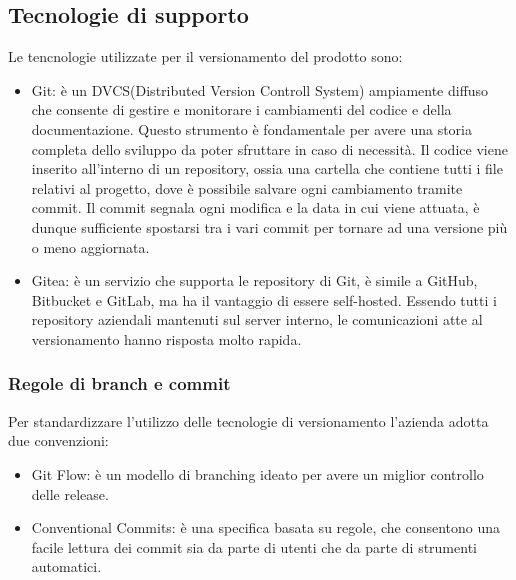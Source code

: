 \subsection{Tecnologie di supporto}
Le tencnologie utilizzate per il versionamento del prodotto sono:
\begin{itemize}
    \item Git: è un DVCS(Distributed Version Controll System) ampiamente diffuso che consente di gestire e monitorare i cambiamenti del codice e della documentazione. Questo strumento è fondamentale per avere una storia completa dello sviluppo da poter sfruttare in caso di necessità. Il codice viene inserito all'interno di un repository, ossia una cartella che contiene tutti i file relativi al progetto, dove è possibile salvare ogni cambiamento tramite commit. Il commit segnala ogni modifica e la data in cui viene attuata, è dunque sufficiente spostarsi tra i vari commit per tornare ad una versione più o meno aggiornata.    
    \item Gitea: è un servizio che supporta le repository di Git, è simile a GitHub, Bitbucket e GitLab, ma ha il vantaggio di essere self-hosted. 
    Essendo tutti i repository aziendali mantenuti sul server interno, le comunicazioni atte al versionamento hanno risposta molto rapida.
\end{itemize}

\subsubsection{Regole di branch e commit}
Per standardizzare l'utilizzo delle tecnologie di versionamento l'azienda adotta due convenzioni:
\begin{itemize}
    \item Git Flow: è un modello di branching ideato per avere un miglior controllo delle release.
    \item Conventional Commits: è una specifica basata su regole, che consentono una facile lettura dei commit sia da parte di utenti che da parte di strumenti automatici. 
\end{itemize}





